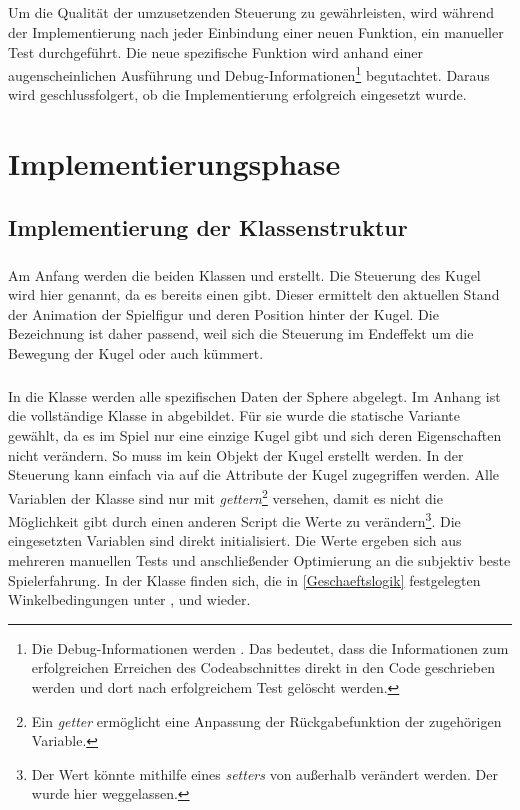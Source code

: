\paragraph{}
Um die Qualität der umzusetzenden Steuerung zu gewährleisten, wird während der Implementierung nach jeder Einbindung einer neuen Funktion, ein manueller Test durchgeführt. Die neue spezifische Funktion wird anhand einer augenscheinlichen Ausführung und Debug-Informationen\footnote{Die Debug-Informationen werden . Das bedeutet, dass die Informationen zum erfolgreichen Erreichen des Codeabschnittes direkt in den Code geschrieben werden und dort nach erfolgreichem Test gelöscht werden.} begutachtet. Daraus wird geschlussfolgert, ob die Implementierung erfolgreich eingesetzt wurde.

\chapter{Implementierungsphase}
\section{Implementierung der Klassenstruktur}
\paragraph{}
Am Anfang werden die beiden Klassen  und  erstellt. Die Steuerung des Kugel wird hier  genannt, da es bereits einen  gibt. Dieser ermittelt den aktuellen Stand der Animation der Spielfigur und deren Position hinter der Kugel. Die Bezeichnung ist daher passend, weil sich die Steuerung im Endeffekt um die Bewegung der Kugel oder auch  kümmert. 
\paragraph{}
In die Klasse  werden alle spezifischen Daten der Sphere abgelegt. Im Anhang ist die vollständige Klasse in  abgebildet. Für sie wurde die statische Variante gewählt, da es im Spiel nur eine einzige Kugel gibt und sich deren Eigenschaften nicht verändern. So muss im  kein Objekt der Kugel erstellt werden. In der Steuerung kann einfach via  auf die Attribute der Kugel zugegriffen werden. Alle Variablen der  Klasse sind nur mit \textit{gettern}\footnote{Ein \textit{getter} ermöglicht eine Anpassung der Rückgabefunktion der zugehörigen Variable.} versehen, damit es nicht die Möglichkeit gibt durch einen anderen Script die Werte zu verändern\footnote{Der Wert könnte mithilfe eines \textit{setters} von außerhalb verändert werden. Der wurde hier weggelassen.}. Die eingesetzten Variablen sind direkt initialisiert. Die Werte ergeben sich aus mehreren manuellen Tests und anschließender Optimierung an die subjektiv beste Spielerfahrung. In der Klasse finden sich, die in \autoref{Geschaeftslogik}  festgelegten Winkelbedingungen unter ,  und  wieder. 
